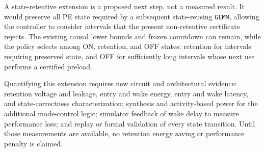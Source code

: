 A state-retentive extension is a proposed next step, not a measured result.
It would preserve all PE state required by a subsequent state-reusing
\texttt{GEMM}, allowing the controller to consider intervals that the present
non-retentive certificate rejects.  The existing causal lower bounds and
frozen countdown can remain, while the policy selects among ON, retention,
and OFF states: retention for intervals requiring preserved state, and OFF
for sufficiently long intervals whose next use performs a certified preload.

Quantifying this extension requires new circuit and architectural evidence:
retention voltage and leakage, entry and wake energy, entry and wake latency,
and state-correctness characterization; synthesis and activity-based power for
the additional mode-control logic; simulator feedback of wake delay to measure
performance loss; and replay or formal validation of every state transition.
Until those measurements are available, no retention energy saving or
performance penalty is claimed.

